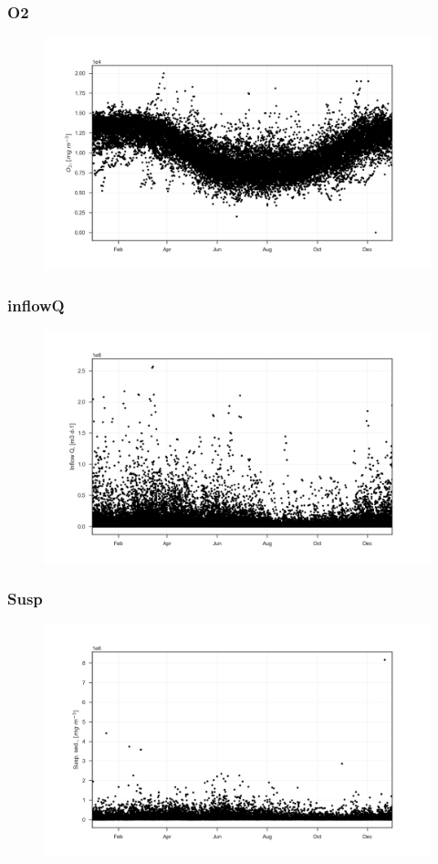 \documentclass{beamer}
\begin{document}
\begin{frame}
\frametitle{O2}
\begin{figure}
\includegraphics[width=\textwidth]{rivers/all/1yr_graph/O2.png}
\end{figure}
\end{frame}

\begin{frame}
\frametitle{inflowQ}
\begin{figure}
\includegraphics[width=\textwidth]{rivers/all/1yr_graph/inflowQ.png}
\end{figure}
\end{frame}

\begin{frame}
\frametitle{Susp}
\begin{figure}
\includegraphics[width=\textwidth]{rivers/all/1yr_graph/Susp.png}
\end{figure}
\end{frame}
\end{document}
